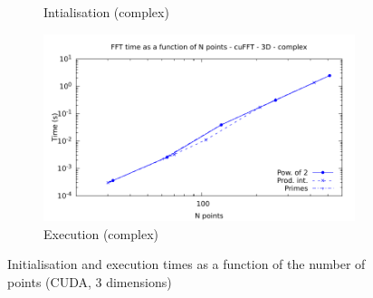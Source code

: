 \documentclass[12pt, a4paper]{article}
\begin{document}
\begin{figure}[H]
\begin{subfigure}{.5\textwidth}
\caption{Intialisation (complex)}
\label{FFTCUDA3DCI}
\end{subfigure}%
\begin{subfigure}{.5\textwidth}
\centering
\includegraphics[width=.9\linewidth]{graphs/fft-cuda-3d-pow2-c-exec.pdf}
\caption{Execution (complex)}
\label{FFTCUDA3DCE}
\end{subfigure}
\caption{Initialisation and execution times as a function of the number of points (CUDA, 3 dimensions)}
\label{FFTCUDA3D}
\end{figure}
\end{document}
